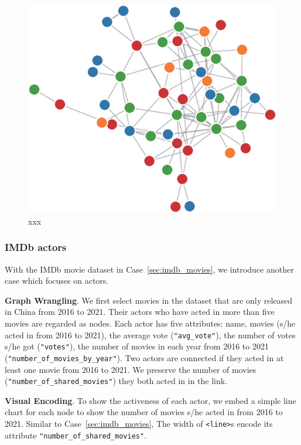 \begin{figure}
    \centering
    \includegraphics[width=1\columnwidth]{figures/iMDBMovies.eps}
    \caption{xxx}
    \label{fig:iMDBMovies}
\end{figure}


\subsubsection{IMDb actors}
With the IMDb movie dataset in Case~\ref{sec:imdb_movies}, we introduce another case which focuses on actors.

\textbf{Graph Wrangling}. We first select movies in the dataset that are only released in China from 2016 to 2021.
Their actors who have acted in more than five movies are regarded as nodes.
Each actor has five attributes: name, movies (s/he acted in from 2016 to 2021), the average vote (\texttt{"avg\_vote"}), the number of votes s/he got (\texttt{"votes"}), the number of movies in each year from 2016 to 2021 (\texttt{"number\_of\_movies\_by\_year"}).
Two actors are connected if they acted in at least one movie from 2016 to 2021.
We preserve the number of movies (\texttt{"number\_of\_shared\_movies"}) they both acted in in the link.

\textbf{Visual Encoding}. To show the activeness of each actor, we embed a simple line chart for each node to show the number of movies s/he acted in from 2016 to 2021. Similar to Case~\ref{sec:imdb_movies}, The width of \texttt{<line>}s encode its attribute \texttt{"number\_of\_shared\_movies"}.

